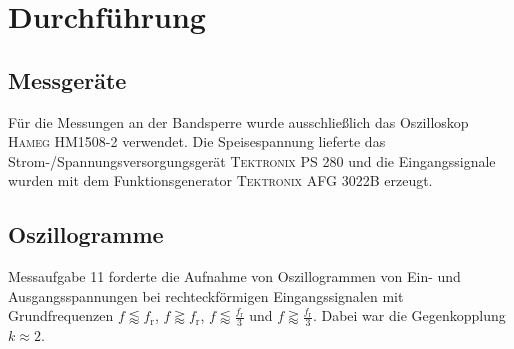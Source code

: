 \documentclass[numbers=noenddot,12pt,a4paper]{scrartcl}
\newcommand{\ix}[1]{_\text{#1}}
\begin{document}
\section{Durchführung}
\subsection{Messgeräte}
Für die Messungen an der Bandsperre wurde ausschließlich das Oszilloskop \textsc{Hameg HM1508-2} verwendet. Die Speisespannung lieferte das Strom-/Spannungsversorgungsgerät \textsc{Tektronix PS 280} und die Eingangssignale wurden mit dem Funktionsgenerator \textsc{Tektronix AFG 3022B} erzeugt.
\subsection{Oszillogramme}
Messaufgabe 11 forderte die Aufnahme von Oszillogrammen von Ein- und Ausgangsspannungen bei rechteckförmigen Eingangssignalen mit Grundfrequenzen $f\lessapprox f\ix{r}$, $f\gtrapprox f\ix{r}$, $f\lessapprox \frac{f\ix{r}}{3}$ und $f\gtrapprox \frac{f\ix{r}}{3}$. Dabei war die Gegenkopplung $k\approx2$.
\end{document}
